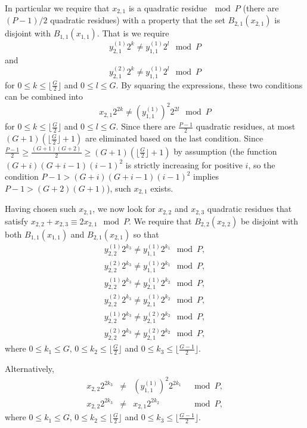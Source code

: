 In particular we require that $x_{2,1}$ is a quadratic
residue$~\mod P$ (there are $(P-1)/2$ quadratic residues) with a
property that the set $B_{2,1}(x_{2,1})$ is disjoint with
$B_{1,1}(x_{1,1})$. That is we require \[y_{2,1}^{(1)}2^k \neq
y_{1,1}^{(1)} 2^l \mod P \] and
\[y_{2,1}^{(2)}2^k \neq y_{1,1}^{(1)} 2^l \mod P \] for $0 \leq k \leq \lfloor
\frac{G}{2} \rfloor$ and $0 \leq l \leq G$. By squaring the
expressions, these two conditions can be combined into
\[x_{2,1}2^{2k} \neq
(y_{1,1}^{(1)})^2 2^{2l} \mod P \]for $0 \leq k \leq \lfloor
\frac{G}{2} \rfloor$ and $0 \leq l \leq G$. Since there are
$\frac{P-1}{2}$ quadratic residues, at most $(G+1)(\lfloor
\frac{G}{2} \rfloor+1)$ are eliminated based on the last
condition. Since $\frac{P-1}{2} \geq \frac{(G+1)(G+2)}{2} \geq
(G+1)(\lfloor \frac{G}{2} \rfloor+1)$ by assumption (the function
$(G+i)(G+i-1)(i-1)^2$ is strictly increasing for positive $i$, so
the condition $P-1> (G+i)(G+i-1)(i-1)^2$ implies
$P-1>(G+2)(G+1)$), such $x_{2,1}$ exists.

Having chosen such $x_{2,1}$, we now look for $x_{2,2}$ and
$x_{2,3}$ quadratic residues that satisfy $x_{2,2}+x_{2,3} \equiv
2x_{2,1} \mod P$. We require that $B_{2,2}(x_{2,2})$ be disjoint
with both $B_{1,1}(x_{1,1})$ and $B_{2,1}(x_{2,1})$ so that
\begin{eqnarray*}
y_{2,2}^{(1)}2^{k_3} \neq y_{1,1}^{(1)} 2^{k_1} \mod P, \\
y_{2,2}^{(2)}2^{k_3} \neq y_{1,1}^{(1)} 2^{k_1} \mod P,  \\
y_{2,2}^{(1)}2^{k_3} \neq y_{2,1}^{(1)} 2^{k_2} \mod P, \\
y_{2,2}^{(2)}2^{k_3} \neq y_{2,1}^{(1)} 2^{k_2} \mod P,  \\
y_{2,2}^{(1)}2^{k_3} \neq y_{2,1}^{(2)} 2^{k_2} \mod P, \\
y_{2,2}^{(2)}2^{k_3} \neq y_{2,1}^{(2)} 2^{k_2} \mod P,
\end{eqnarray*}
where $0 \leq k_1 \leq G$, $0 \leq k_2 \leq \lfloor \frac{G}{2}
\rfloor$ and $0 \leq k_3 \leq \lfloor\frac{G-1}{2} \rfloor$.

Alternatively,
\begin{equation}\label{eqx22}\begin{array}{cccc}
x_{2,2}2^{2k_3} &\neq& (y_{1,1}^{(1)})^2 2^{2k_1} &\mod P, \\
x_{2,2}2^{2k_3} &\neq& x_{2,1} 2^{2k_2} &\mod P,
\end{array}\end{equation}
where $0 \leq k_1 \leq G$, $0 \leq k_2 \leq \lfloor \frac{G}{2}
\rfloor$ and $0 \leq k_3 \leq \lfloor\frac{G-1}{2} \rfloor$.


